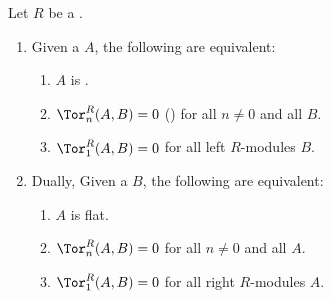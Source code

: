 \begin{proposition} \label{proposition:module_over_a_ring_is_flat_if_and_only_if_higher_tors_vanish}
    Let $R$ be a .
    \begin{enumerate}
        \item Given a  $A$, the following are equivalent:
        \begin{enumerate}
            \item $A$ is .
            \item $\Tor_n^R(A,B) = 0$ () for all $n \neq 0$ and all  $B$.
            \item $\Tor_1^R(A,B) = 0$ for all left $R$-modules $B$.
        \end{enumerate}
        \item Dually, Given a  $B$, the following are equivalent:
        \begin{enumerate}
            \item $A$ is flat.
            \item $\Tor_n^R(A,B) = 0$ for all $n \neq 0$ and all  $A$.
            \item $\Tor_1^R(A,B) = 0$ for all right $R$-modules $A$.
        \end{enumerate}
    \end{enumerate}
\end{proposition}